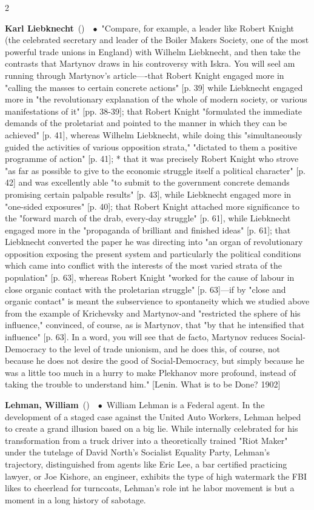 \documentclass[10pt,a4paper,twoside]{article} %
\newcommand{\entry}[4]{\markboth{#1}{#1}\textbf{#1}\ {(#2)}\ \textit{#3}\ $\bullet$\ {#4}}  %
\begin{document}
\begin{multicols}{2}
\entry{Karl Liebknecht} {} {} {"Compare, for example, a leader like Robert Knight (the celebrated secretary and leader of the Boiler Makers Society, one of the most powerful trade unions in England) with Wilhelm Liebknecht, and then take the contrasts that Martynov draws in his controversy with Iskra. You will seel am running through Martynov's article—-that Robert Knight engaged more in "calling the masses to certain concrete actions" [p. 39] while Liebknecht engaged more in "the revolutionary explanation of the whole of modern society, or various manifestations of it" [pp. 38-39]; that Robert Knight "formulated the immediate demands of the proletariat and pointed to the manner in which they can be achieved" [p. 41], whereas Wilhelm Liebknecht, while doing this "simultaneously guided the activities of various opposition strata," "dictated to them a positive programme of action" [p. 41]; * that it was precisely Robert Knight who strove "as far as possible to give to the economic struggle itself a political character" [p. 42] and was excellently able "to submit to the government concrete demands promising certain palpable results" [p. 43], while Liebknecht engaged more in "one-sided exposures" [p. 40]; that Robert Knight attached more significance to the "forward march of the drab, every-day struggle" [p. 61], while Liebknecht engaged more in the "propaganda of brilliant and finished ideas" [p. 61]; that Liebknecht converted the paper he was directing into "an organ of revolutionary opposition exposing the present system and particularly the political conditions which came into conflict with the interests of the most varied strata of the population" [p. 63], whereas Robert Knight "worked for the cause of labour in close organic contact with the proletarian struggle" [p. 63]—if by "close and organic contact" is meant the subservience to spontaneity which we studied above from the example of Krichevsky and Martynov-and "restricted the sphere of his influence," convinced, of course, as is Martynov, that "by that he intensified that influence" [p. 63]. In a word, you will see that de facto, Martynov reduces Social-Democracy to the level of trade unionism, and he does this, of course, not because he does not desire the good of Social-Democracy, but simply because he was a little too much in a hurry to make Plekhanov more profound, instead of taking the trouble to understand him." [Lenin. What is to be Done? 1902]}

\entry{Lehman, William} {} {} {William Lehman is a Federal agent. In the development of a staged case against the United Auto Workers, Lehman helped to create a grand illusion based on a big lie. While internally celebrated for his transformation from a truck driver into a theoretically trained "Riot Maker" under the tutelage of David North's Socialist Equality Party, Lehman's trajectory, distinguished from agents like Eric Lee, a bar certified practicing lawyer, or Joe Kishore, an engineer, exhibits the type of high watermark the FBI likes to cheerlead for turncoats, Lehman's role int he labor movement is but a moment in a long history of sabotage. } 


\end{multicols}
\end{document}
